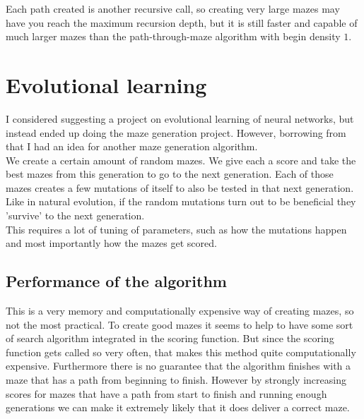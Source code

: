 \documentclass[10pt, a4paper, twoside]{amsart}
\newcommand{\1}{\mathbbm{1}}
\begin{document}
Each path created is another recursive call, so creating very large mazes may have you reach the maximum recursion depth, but it is still faster and capable of much larger mazes than the path-through-maze algorithm with begin density $1$.


\section{Evolutional learning}
I considered suggesting a project on evolutional learning of neural networks, but instead ended up doing the maze generation project. However, borrowing from that I had an idea for another maze generation algorithm.\\
We create a certain amount of random mazes. We give each a score and take the best mazes from this generation to go to the next generation. Each of those mazes creates a few mutations of itself to also be tested in that next generation. Like in natural evolution, if the random mutations turn out to be beneficial they 'survive' to the next generation.\\
This requires a lot of tuning of parameters, such as how the mutations happen and most importantly how the mazes get scored.

\subsection{Performance of the algorithm}
This is a very memory and computationally expensive way of creating mazes, so not the most practical. To create good mazes it seems to help to have some sort of search algorithm integrated in the scoring function. But since the scoring function gets called so very often, that makes this method quite computationally expensive.
Furthermore there is no guarantee that the algorithm finishes with a maze that has a path from beginning to finish. However by strongly increasing scores for mazes that have a path from start to finish and running enough generations we can make it extremely likely that it does deliver a correct maze.
\end{document}
